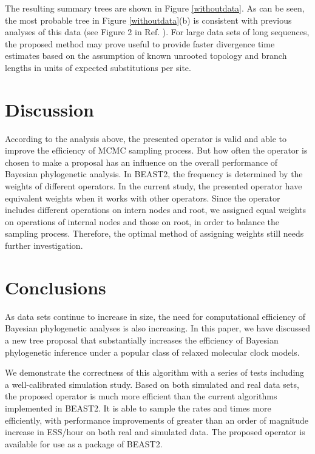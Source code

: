 \documentclass{bmcart}
\begin{document}
The resulting summary trees are shown in Figure \ref{withoutdata}. As can be seen, the most probable tree in Figure \ref{withoutdata}(b) is consistent with previous analyses of this data (see Figure 2 in Ref. \cite{cooper2001complete}). For large data sets of long sequences, the proposed method may prove useful to provide faster divergence time estimates based on the assumption of known unrooted topology and branch lengths in units of expected substitutions per site.

\section*{Discussion}
According to the analysis above, the presented operator is valid and able to improve the efficiency of MCMC sampling process. But how often the operator is chosen to make a proposal has an influence on the overall performance of Bayesian phylogenetic analysis. In BEAST2, the frequency is determined by the weights of different operators. In the current study, the presented operator have equivalent weights when it works with other operators. Since the operator includes different operations on intern nodes and root, we assigned equal weights on operations of internal nodes and those on root, in order to balance the sampling process. Therefore, the optimal method of assigning weights still needs further investigation. 

\section*{Conclusions}
As data sets continue to increase in size, the need for computational efficiency of Bayesian phylogenetic analyses is also increasing. In this paper, we have discussed a new tree proposal that substantially increases the efficiency of Bayesian phylogenetic inference under a popular class of relaxed molecular clock models.

We demonstrate the correctness of this algorithm with a series of tests including a well-calibrated simulation study. Based on both simulated and real data sets, the proposed operator is much more efficient than the current algorithms implemented in BEAST2. It is able to sample the rates and times more efficiently, with performance improvements of greater than an order of magnitude increase in ESS/hour on both real and simulated data. The proposed operator is available for use as a package of BEAST2.
\end{document}
